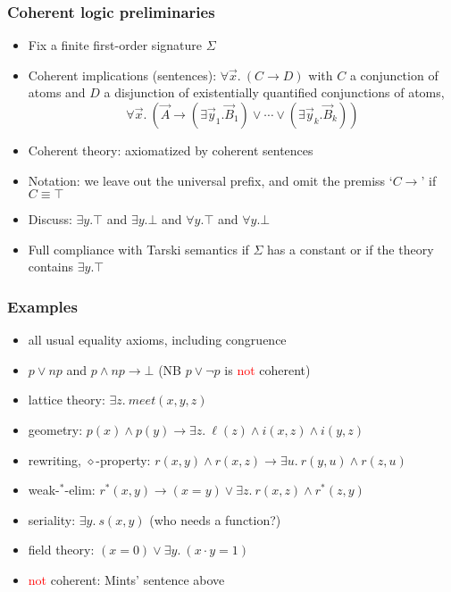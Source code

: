 \documentclass[handout,11pt,hyperref ={colorlinks = true, urlcolor = red}]{beamer}
\newcommand{\red}[1]{\textcolor{red}{#1}}
\begin{document}
\begin{frame}
\frametitle{Coherent logic preliminaries}
 \begin{itemize}[<+->]   %
    \item Fix a finite first-order signature $\Sigma$
    \item Coherent implications (sentences): $\forall\vec{x}.~(C \to D)$ 
    with $C$ a conjunction of atoms and $D$ a disjunction of existentially
    quantified conjunctions of atoms,
\[  \forall\vec{x}.~ (\vec{A} \to 
(\exists\vec{y}_1.\vec{B}_1) \lor \cdots \lor (\exists\vec{y}_k.\vec{B}_k))
\]
    \item Coherent theory: axiomatized by coherent sentences
    \item Notation: we leave out the universal prefix, 
    and omit the premiss `$C\to{}$' if $C\equiv\top$
    \item Discuss: $\exists y.\top$ and $\exists y.\bot$ and
    $\forall y.\top$ and $\forall y.\bot$
    \item Full compliance with Tarski semantics if $\Sigma$ has a constant
    or if the theory contains $\exists y.\top$
 \end{itemize}
\end{frame}

\begin{frame}
\frametitle{Examples}
 \begin{itemize}[<+->]   %
    \item all usual equality axioms, including congruence
    \item $p\lor np$ and $p\land np\to\bot$ 
    (NB $p\lor\neg p$ is \red{not} coherent)
    \item lattice theory: $%
    \exists z.~\mathit{meet}(x,y,z)$
    \item geometry: $%
    p(x)\land p(y) \to \exists z.~\ell(z) \land i(x,z) \land i(y,z)$
    \item rewriting, $\diamond$-property: $%
    r(x,y)\land r(x,z) \to \exists u.~r(y,u)\land r(z,u)$
    \item weak-${}^*$-elim: $%
    r^*(x,y)\to (x=y)\lor\exists z.~r(x,z)\land r^*(z,y)$     
    \item seriality: $%
    \exists y.~s(x,y)$ (who needs a function?)
    \item field theory: $%
    (x=0) \lor \exists y.~(x\cdot y=1)$
    \item \red{not} coherent: Mints' sentence above
 \end{itemize}
\end{frame}
\end{document}
